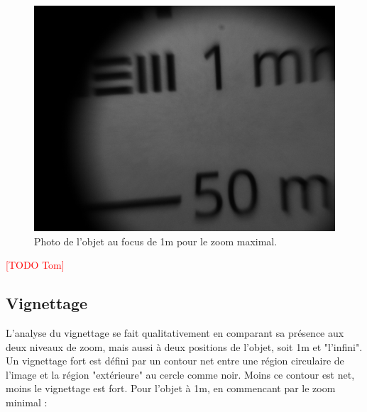 \documentclass[11pt,letterpaper]{article}
\begin{document}
\begin{figure}[H]
  \centering
  \includegraphics[scale=0.3]{res_1m_max.png}
  \caption{Photo de l'objet au focus de 1m pour le zoom maximal.}
  \label{res_max}
\end{figure}
\textcolor{red}{[TODO Tom]} 




\subsection{Vignettage}

L'analyse du vignettage se fait qualitativement en comparant sa présence aux deux
niveaux de zoom, mais aussi à deux positions de l'objet, soit 1m et "l'infini". 
Un vignettage fort est défini par un contour net entre une région circulaire de 
l'image et la région "extérieure" au cercle comme noir. Moins ce contour est net, 
moins le vignettage est fort. Pour l'objet à 1m, en commencant par le zoom minimal : 
\end{document}
